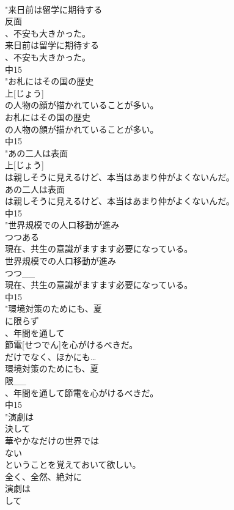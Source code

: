 \documentclass[8pt]{extreport}
\begin{document}
\begin{CJK}{UTF8}{min}
\\	"来日前は留学に期待する
\\	反面
\\	、不安も大きかった。
\\	来日前は留学に期待する
\\	、不安も大きかった。
\\	中15
\\	"お札にはその国の歴史
\\	上[じょう]
\\	の人物の顔が描かれていることが多い。
\\	お札にはその国の歴史
\\	の人物の顔が描かれていることが多い。
\\	中15
\\	"あの二人は表面
\\	上[じょう]
\\	は親しそうに見えるけど、本当はあまり仲がよくないんだ。
\\	あの二人は表面
\\	は親しそうに見えるけど、本当はあまり仲がよくないんだ。
\\	中15
\\	"世界規模での人口移動が進み
\\	つつある
\\	現在、共生の意識がますます必要になっている。
\\	世界規模での人口移動が進み
\\	つつ__
\\	現在、共生の意識がますます必要になっている。
\\	中15
\\	"環境対策のためにも、夏
\\	に限らず
\\	、年間を通して
\\	節電[せつでん]を心がけるべきだ。
\\	だけでなく、ほかにも…　
\\	環境対策のためにも、夏
\\	限__
\\	、年間を通して節電を心がけるべきだ。
\\	中15
\\	"演劇は
\\	決して
\\	華やかなだけの世界では
\\	ない
\\	ということを覚えておいて欲しい。
\\	全く、全然、絶対に 
\\	演劇は
\\	して

\end{CJK}
\end{document}
